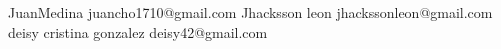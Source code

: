 JuanMedina
juancho1710@gmail.com
Jhacksson leon
jhackssonleon@gmail.com
deisy cristina gonzalez
deisy42@gmail.com
